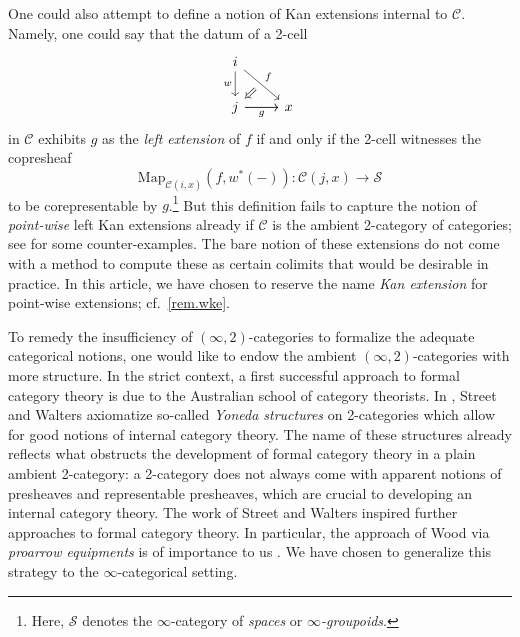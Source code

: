 \documentclass[a4paper, 11pt]{amsart}
\numberwithin{theorem}{section}
\theoremstyle{definition}
\newcommand{\map}{\mathrm{Map}}
\renewcommand{\S}{\mathscr{S}}
\newcommand{\C}{\mathscr{C}}
\begin{document}
One could also attempt to define a notion of Kan extensions internal to $\C$. Namely, one could say that the datum of a 2-cell 
\[
    \begin{tikzcd}
        i \arrow[dr,"f"name=f]\arrow[d,"w"'] \\
        |[alias=t]|j\arrow[r,"g"'] \arrow[r] & x
        \arrow[from=f,to=t,Rightarrow, shorten <= 6pt]
    \end{tikzcd}
\]
in $\C$ exhibits $g$ as the \textit{left extension} of $f$ if and only if the 2-cell witnesses the copresheaf 
$$
\map_{\C(i,x)}(f, w^*(-)) : \C(j,x) \rightarrow \S
$$
to be corepresentable by $g$.\footnote{Here, $\S$ denotes the $\infty$-category of \textit{spaces} or \textit{$\infty$-groupoids}.} But this definition fails to capture the notion of \textit{point-wise} left Kan extensions already if 
$\C$ is the ambient 2-category of categories; see \cite{CampionCounterEx} for some counter-examples. The bare notion of these 
extensions do not come with a method to compute these as certain colimits that would be desirable in practice.
In this article, we have 
chosen to reserve the name \textit{Kan extension} for point-wise extensions; cf.\ \cref{rem.wke}.

To remedy the insufficiency of $(\infty,2)$-categories to formalize the adequate categorical notions, one would like to endow the ambient $(\infty,2)$-categories with more structure. 
In the strict context, a first successful approach to formal category theory is due to the Australian school of category theorists. In \cite{StreetWalters}, Street and Walters axiomatize 
so-called \textit{Yoneda structures} on 2-categories which allow for good notions of internal category theory.
The name of these structures already reflects what obstructs the development of formal category theory in a plain ambient 2-category: a 2-category 
does not always come with apparent notions of presheaves and representable presheaves, which are crucial to developing an internal category theory.
The work of Street and Walters inspired further approaches to formal category theory. In particular, the approach of Wood via \textit{proarrow equipments}
is of importance to us \cite{Wood}. We have chosen to generalize this strategy to the $\infty$-categorical setting.
\end{document}
